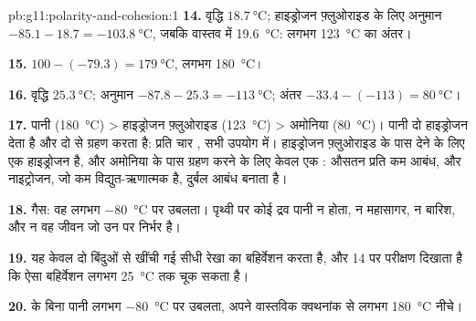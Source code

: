 \begin{solution}{pb:g11:polarity-and-cohesion:1}
\textbf{14.} वृद्धि $\qty{18.7}{\celsius}$; हाइड्रोजन फ़्लुओराइड के लिए अनुमान
$-85.1 - 18.7 = \qty{-103.8}{\celsius}$, जबकि वास्तव में \qty{19.6}{\celsius}: लगभग
\qty{123}{\celsius} का अंतर।

\textbf{15.} $100 - (-79.3) = \qty{179}{\celsius}$, लगभग
\qty{180}{\celsius}।

\textbf{16.} वृद्धि $\qty{25.3}{\celsius}$; अनुमान $-87.8 - 25.3 =
\qty{-113}{\celsius}$; अंतर $-33.4 - (-113) = \qty{80}{\celsius}$।

\textbf{17.} पानी (\qty{180}{\celsius}) > हाइड्रोजन फ़्लुओराइड
(\qty{123}{\celsius}) > अमोनिया (\qty{80}{\celsius})। पानी दो
हाइड्रोजन  देता है और दो  से ग्रहण करता है: प्रति  चार
, सभी उपयोग में। हाइड्रोजन फ़्लुओराइड के पास देने के लिए एक हाइड्रोजन
है, और अमोनिया के पास ग्रहण करने के लिए केवल एक : औसतन प्रति  कम
आबंध, और नाइट्रोजन, जो कम विद्युत-ऋणात्मक है, दुर्बल आबंध बनाता है।

\textbf{18.} गैस: वह लगभग \qty{-80}{\celsius} पर उबलता। पृथ्वी पर
कोई द्रव पानी न होता, न महासागर, न बारिश, और न वह जीवन
जो उन पर निर्भर है।

\textbf{19.} यह केवल दो बिंदुओं से खींची गई सीधी रेखा का बहिर्वेशन करता है,
और  14 पर परीक्षण दिखाता है कि ऐसा बहिर्वेशन
लगभग \qty{25}{\celsius} तक चूक सकता है।

\textbf{20.}  के बिना पानी लगभग \qty{-80}{\celsius} पर उबलता,
अपने वास्तविक क्वथनांक से लगभग \qty{180}{\celsius}
नीचे।
\end{solution}
